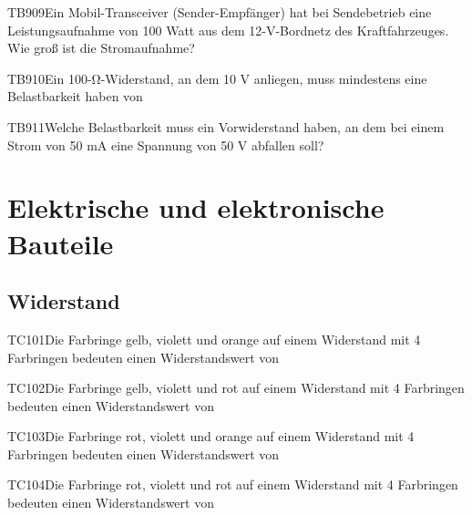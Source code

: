 \begin{question}{TB909}{Ein Mobil-Transceiver (Sender-Empfänger) hat bei Sendebetrieb eine Leistungsaufnahme von 100 Watt aus dem 12-V-Bordnetz des Kraftfahrzeuges. Wie groß ist die Stromaufnahme?}
\end{question}

\begin{question}{TB910}{Ein 100-Ω-Widerstand, an dem 10 V anliegen, muss mindestens eine Belastbarkeit haben von}
\end{question}

\begin{question}{TB911}{Welche Belastbarkeit muss ein Vorwiderstand haben, an dem bei einem Strom von 50 mA eine Spannung von 50 V abfallen soll?}
\end{question}

\section{Elektrische und elektronische Bauteile}

\subsection{Widerstand}

\begin{question}{TC101}{Die Farbringe gelb, violett und orange auf einem Widerstand mit 4 Farbringen bedeuten einen Widerstandswert von}
\end{question}

\begin{question}{TC102}{Die Farbringe gelb, violett und rot auf einem Widerstand mit 4 Farbringen bedeuten einen Widerstandswert von}
\end{question}

\begin{question}{TC103}{Die Farbringe rot, violett und orange auf einem Widerstand mit 4 Farbringen bedeuten einen Widerstandswert von}
\end{question}

\begin{question}{TC104}{Die Farbringe rot, violett und rot auf einem Widerstand mit 4 Farbringen bedeuten einen Widerstandswert von}
\end{question}

